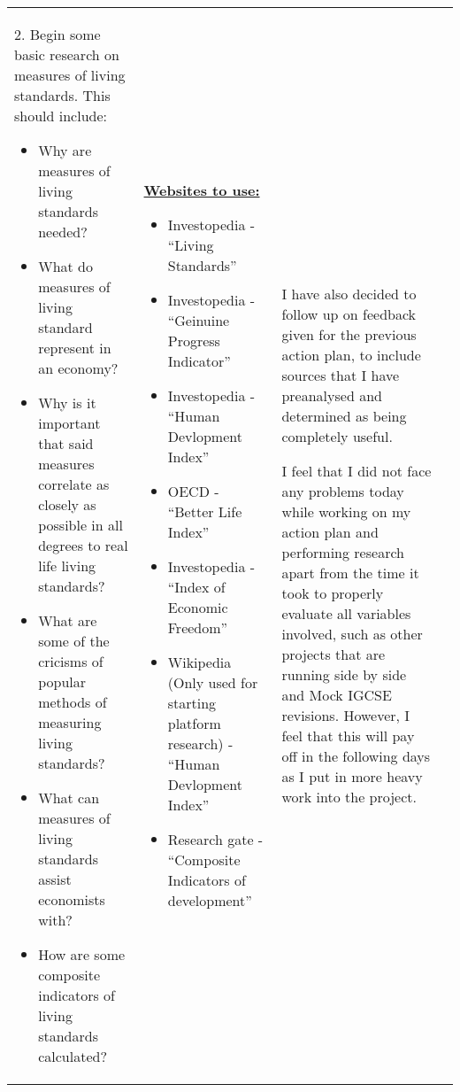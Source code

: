 \documentclass[11pt, a4paper]{article}
\begin{document}
\begin{landscape}
\begin{longtable}{|m{2.5cm}|m{6.6cm}|m{6.6cm}|m{9.41cm}|}
			 	2. Begin some basic research on measures of living standards. This should include:
			 	
			 	\begin{itemize}
					\item Why are measures of living standards needed?
					\item What do measures of living standard represent in an economy?
					\item Why is it important that said measures correlate as closely as possible in all degrees to real life living standards?
					\item What are some of the cricisms of popular methods of measuring living standards?
					\item What can measures of living standards assist economists with?
					\item How are some composite indicators of living standards calculated?
				\end{itemize}
		 	
			  	& 
		 	
				\textbf{\underline{Websites to use:}}
				\newline
			
				\begin{itemize}
					\item Investopedia - ``Living Standards''
					\item Investopedia - ``Geinuine Progress Indicator''
					\item Investopedia - ``Human Devlopment Index''
					\item OECD - ``Better Life Index''
					\item Investopedia - ``Index of Economic Freedom''
					\item Wikipedia (Only used for starting platform research) - ``Human Devlopment Index''
					\item Research gate - ``Composite Indicators of development''
				\end{itemize}
				
				&
				I have also decided to follow up on feedback given for the previous action plan, to include sources that I have preanalysed and determined as being completely useful.


				I feel that I did not face any problems today while working on my action plan and performing research apart from the time it took to properly evaluate all variables involved, such as other projects that are running side by side and Mock IGCSE revisions. However, I feel that this will pay off in the following days as I put in more heavy work into the project.


\end{longtable}
\end{landscape}
\end{document}
